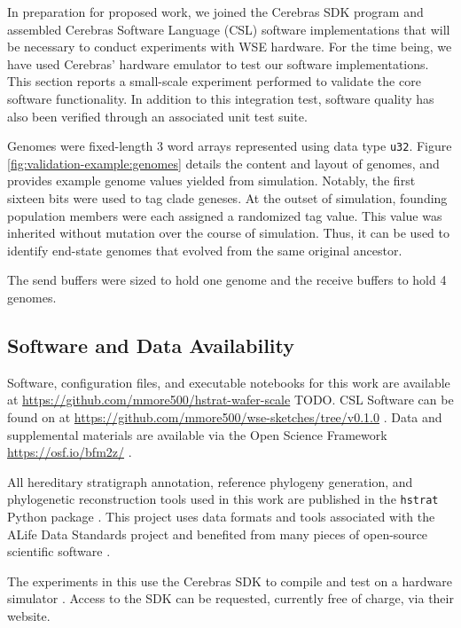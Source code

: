 In preparation for proposed work, we joined the Cerebras SDK program \citep{selig2022cerebras} and assembled Cerebras Software Language (CSL) software implementations that will be necessary to conduct experiments with WSE hardware.
For the time being, we have used Cerebras' hardware emulator to test our software implementations.
This section reports a small-scale experiment performed to validate the core software functionality.
In addition to this integration test, software quality has also been verified through an associated unit test suite.

Genomes were fixed-length 3 word arrays represented using data type \texttt{u32}.
Figure \ref{fig:validation-example:genomes} details the content and layout of genomes, and provides example genome values yielded from simulation.
Notably, the first sixteen bits were used to tag clade geneses.
At the outset of simulation, founding population members were each assigned a randomized tag value.
This value was inherited without mutation over the course of simulation.
Thus, it can be used to identify end-state genomes that evolved from the same original ancestor.

The send buffers were sized to hold one genome and the receive buffers to hold 4 genomes.


\subsection{Software and Data Availability}

Software, configuration files, and executable notebooks for this work are available at \url{https://github.com/mmore500/hstrat-wafer-scale} TODO.
CSL Software can be found on at \url{https://github.com/mmore500/wse-sketches/tree/v0.1.0} \citep{moreno2024wse}.
Data and supplemental materials are available via the Open Science Framework \url{https://osf.io/bfm2z/} \citep{foster2017open}.

All hereditary stratigraph annotation, reference phylogeny generation, and phylogenetic reconstruction tools used in this work are published in the \texttt{hstrat} Python package \citep{moreno2022hstrat}.
This project uses data formats and tools associated with the ALife Data Standards project \citep{lalejini2019data} and benefited from many pieces of open-source scientific software \citep{sand2014tqdist,2020SciPy-NMeth,harris2020array,reback2020pandas,mckinney-proc-scipy-2010,sukumaran2010dendropy,cock2009biopython,dolson2024phylotrackpy,torchiano2016effsize,waskom2021seaborn,hunter2007matplotlib,moreno2024apc,moreno2023teeplot,torchiano2016effsize,moreno2024pecking,moreno2024joinem,moreno2024hsurf}.

The experiments in this use the Cerebras SDK to compile and test on a hardware simulator \citep{TODOCITE}.
Access to the SDK can be requested, currently free of charge, via their website.
